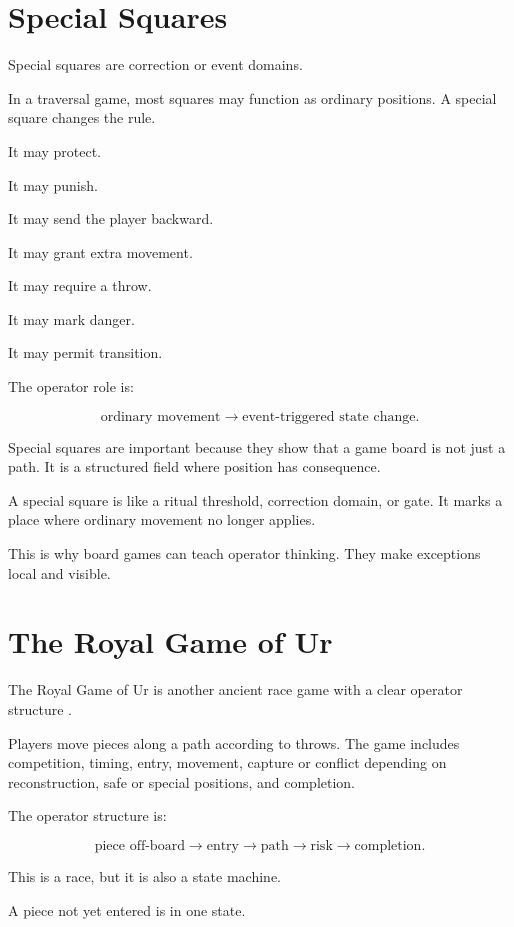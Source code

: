 \documentclass[11pt]{book}
\begin{document}
\section{Special Squares}

Special squares are correction or event domains.

In a traversal game, most squares may function as ordinary positions. A special square changes the rule.

It may protect.

It may punish.

It may send the player backward.

It may grant extra movement.

It may require a throw.

It may mark danger.

It may permit transition.

The operator role is:

\[
\text{ordinary movement}
\rightarrow
\text{event-triggered state change}.
\]

Special squares are important because they show that a game board is not just a path. It is a structured field where position has consequence.

A special square is like a ritual threshold, correction domain, or gate. It marks a place where ordinary movement no longer applies.

This is why board games can teach operator thinking. They make exceptions local and visible.

\section{The Royal Game of Ur}

The Royal Game of Ur is another ancient race game with a clear operator structure \cite{Finkel2007AncientBoardGames,Murray1952BoardGames}.

Players move pieces along a path according to throws. The game includes competition, timing, entry, movement, capture or conflict depending on reconstruction, safe or special positions, and completion.

The operator structure is:

\[
\text{piece off-board}
\rightarrow
\text{entry}
\rightarrow
\text{path}
\rightarrow
\text{risk}
\rightarrow
\text{completion}.
\]

This is a race, but it is also a state machine.

A piece not yet entered is in one state.
\end{document}
